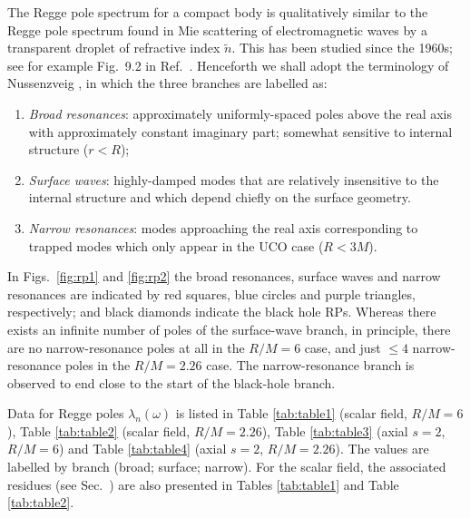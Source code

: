 \documentclass[aps,prd,longbibliography,reprint,twocolumn,amsmath,amssymb,amsfonts,showpacs,superscriptaddress]{revtex4-1}%
\begin{document}
The Regge pole spectrum for a compact body is qualitatively similar to the Regge pole spectrum found in Mie scattering of electromagnetic waves by a transparent droplet of refractive index $\tilde{n}$. This has been studied since the 1960s; see for example Fig.~9.2 in Ref.~\cite{Nussenzveig:2006}. %
Henceforth we shall adopt the terminology of Nussenzveig \cite{Nussenzveig:2006}, in which the three branches are labelled as:
\begin{enumerate}
 \item \emph{Broad resonances}: approximately uniformly-spaced poles above the real axis with approximately constant imaginary part; somewhat sensitive to internal structure ($r < R$);
 \item \emph{Surface waves}: highly-damped modes that are relatively insensitive to the internal structure and which depend chiefly on the surface geometry. 
 \item \emph{Narrow resonances}: modes approaching the real axis corresponding to trapped modes which only appear in the UCO case ($R < 3M$). 
\end{enumerate}
In Figs.~\ref{fig:rp1} and \ref{fig:rp2} the broad resonances, surface waves and narrow resonances are indicated by red squares, blue circles and purple triangles, respectively; and black diamonds indicate the black hole RPs. Whereas there exists an infinite number of poles of the surface-wave branch, in principle, there are no narrow-resonance poles at all in the $R/M = 6$ case, and just $\le 4$ narrow-resonance poles in the $R/M = 2.26$ case. The narrow-resonance branch is observed to end close to the start of the black-hole branch.

Data for Regge poles $\lambda_n(\omega)$ is listed in Table \ref{tab:table1} (scalar field, $R/M=6$), Table \ref{tab:table2} (scalar field, $R/M = 2.26$), Table \ref{tab:table3} (axial $s=2$, $R/M = 6$) and Table \ref{tab:table4} (axial $s=2$, $R/M = 2.26$). The values are labelled by branch (broad; surface; narrow). For the scalar field, the associated residues (see Sec.~) are also presented in Tables \ref{tab:table1} and Table \ref{tab:table2}.
\end{document}
